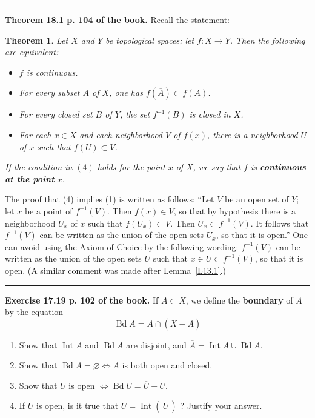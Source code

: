 \documentclass[12pt,letterpaper]{article}
\newtheorem{thm}{Theorem}%
\newcommand{\hs}{\bigskip\hrule\medskip}
\newcommand{\noi}{\noindent}%
\begin{document}
\hs

\noi\textbf{Theorem 18.1 p. 104 of the book.} Recall the statement:

\begin{thm}
Let $X$ and $Y$ be topological spaces; let $f: X \to Y$. Then the following are equivalent:
\begin{itemize}
    \item[$(1)$] $f$ is continuous.
    \item[$(2)$] For every subset $A$ of $X$, one has $f(\overline{A}) \subset \overline{f(A)}$.
    \item[$(3)$] For every closed set $B$ of $Y$, the set $f^{-1}(B)$ is closed in $X$.
    \item[$(4)$] For each $x \in X$ and each neighborhood $V$ of $f(x)$, there is a neighborhood $U$ of $x$ such that $f(U) \subset V$.
\end{itemize}
If the condition in $(4)$ holds for the point $x$ of $X$, we say that $f$ is \textbf{continuous at the point} $x$.
\end{thm} %

The proof that (4) implies (1) is written as follows: ``Let $V$ be an open set of $Y$; let $x$ be a point of $f^{-1}(V)$. Then $f(x) \in V$, so that by hypothesis there is a neighborhood $U_x$ of $x$ such that $f(U_x) \subset V$. Then $U_x \subset f^{-1}(V)$. It follows that $f^{-1}(V)$ can be written as the union of the open sets $U_x$, so that it is open.'' One can avoid using the Axiom of Choice by the following wording: $f^{-1}(V)$ can be written as the union of the open sets $U$ such that $x\in U\subset f^{-1}(V)$, so that it is open. (A similar comment was made after Lemma~\ref{L13.1}.) 

\hs

\noi\textbf{Exercise 17.19 p. 102 of the book.} If $A\subset X$, we define the \textbf{boundary} of $A$ by the equation
$$
\operatorname{Bd}A=\overline{A}\cap(\overline{X-A})
$$
\begin{enumerate}
    \item[(a)] Show that $\operatorname{Int} A$ and $\operatorname{Bd} A$ are disjoint, and $\overline{A}=\operatorname{Int}A\cup\operatorname{Bd}A$.
    \item[(b)] Show that $\operatorname{Bd}A=\varnothing\Leftrightarrow A$ is both open and closed.
    \item[(c)] Show that $U$ is open $\Leftrightarrow\operatorname{Bd} U=\overline{U}-U$.
    \item[(d)] If $U$ is open, is it true that $U=\operatorname{Int}(\,\overline{U}\,)$ ? Justify your answer.
\end{enumerate}
\end{document}
